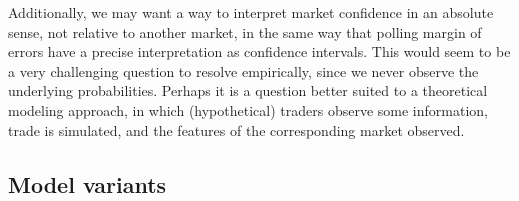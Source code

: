 \documentclass[sigconf,anonymous]{aamas}   %
\begin{document}
Additionally, we may want a way to interpret market confidence in an absolute sense, not relative to another market, in the same way that polling margin of errors have a precise interpretation as confidence intervals. This would seem to be a very challenging question to resolve empirically, since we never observe the underlying probabilities. Perhaps it is a question better suited to a theoretical modeling approach, in which (hypothetical) traders observe some information, trade is simulated, and the features of the corresponding market observed.



\subsection{Model variants}
\end{document}
